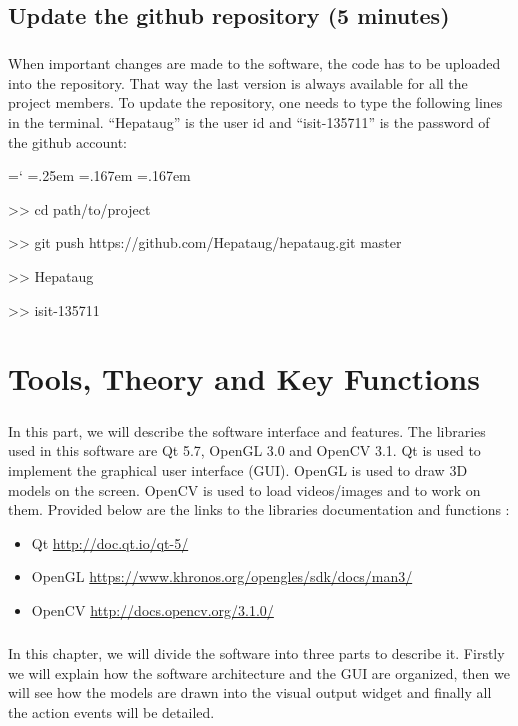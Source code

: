 \documentclass[12pt]{report}
\DeclareRobustCommand*{\ttfamily}{
  \origttfamily
  \hyphenchar\font=`\-\relax
  \fontdimen3\font=.25em\relax
  \fontdimen4\font=.167em\relax
  \fontdimen7\font=.167em\relax
}
\newenvironment{code}{\ttfamily}{}
\begin{document}
\section{Update the github repository (5 minutes)}
\paragraph{}
	When important changes are made to the software, the code has to be uploaded into the repository. That way the last version is always available for all the project members. To update the repository, one needs to type the following lines in the terminal. ``Hepataug'' is the user id and ``isit-135711'' is the password of the github account:

\begin{code}
>> cd path/to/project

>> git push https://github.com/Hepataug/hepataug.git master

>> Hepataug

>> isit-135711
\end{code}



\chapter{Tools, Theory and Key Functions} \label{sec:tools, theory and key functions}
\paragraph{}
	In this part, we will describe the software interface and features. The libraries used in this software are Qt 5.7, OpenGL 3.0 and OpenCV 3.1. Qt is used to implement the graphical user interface (GUI). OpenGL is used to draw 3D models on the screen. OpenCV is used to load videos/images and to work on them. Provided below are the links to the libraries documentation and functions :
	\begin{itemize}
	\item Qt \url{http://doc.qt.io/qt-5/}
	\item OpenGL \url{https://www.khronos.org/opengles/sdk/docs/man3/}
	\item OpenCV \url{http://docs.opencv.org/3.1.0/}
	\end{itemize}

\paragraph{}
In this chapter, we will divide the software into three parts to describe it. Firstly we will explain how the software architecture and the GUI are organized, then we will see how the models are drawn into the visual output widget and finally all the action events will be detailed.
\end{document}
